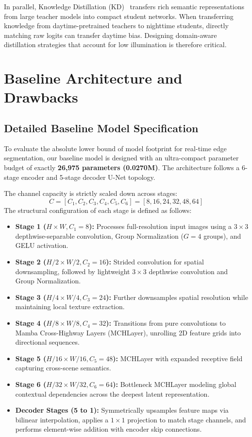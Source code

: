 \documentclass[conference]{IEEEtran}
\begin{document}
In parallel, Knowledge Distillation (KD)~\cite{hinton2015distilling} transfers rich semantic representations from large teacher models into compact student networks. When transferring knowledge from daytime-pretrained teachers to nighttime students, directly matching raw logits can transfer daytime bias. Designing domain-aware distillation strategies that account for low illumination is therefore critical.

\section{Baseline Architecture and Drawbacks}

\subsection{Detailed Baseline Model Specification}
To evaluate the absolute lower bound of model footprint for real-time edge segmentation, our baseline model is designed with an ultra-compact parameter budget of exactly \textbf{26,975 parameters (0.0270M)}. The architecture follows a 6-stage encoder and 5-stage decoder U-Net topology.

The channel capacity is strictly scaled down across stages:
\begin{equation}
C = [C_1, C_2, C_3, C_4, C_5, C_6] = [8, 16, 24, 32, 48, 64]
\end{equation}
The structural configuration of each stage is defined as follows:
\begin{itemize}
    \item \textbf{Stage 1 ($H \times W, C_1=8$):} Processes full-resolution input images using a $3 \times 3$ depthwise-separable convolution, Group Normalization ($G=4$ groups), and GELU activation.
    \item \textbf{Stage 2 ($H/2 \times W/2, C_2=16$):} Strided convolution for spatial downsampling, followed by lightweight $3 \times 3$ depthwise convolution and Group Normalization.
    \item \textbf{Stage 3 ($H/4 \times W/4, C_3=24$):} Further downsamples spatial resolution while maintaining local texture extraction.
    \item \textbf{Stage 4 ($H/8 \times W/8, C_4=32$):} Transitions from pure convolutions to Mamba Cross-Highway Layers (MCHLayer), unrolling 2D feature grids into directional sequences.
    \item \textbf{Stage 5 ($H/16 \times W/16, C_5=48$):} MCHLayer with expanded receptive field capturing cross-scene semantics.
    \item \textbf{Stage 6 ($H/32 \times W/32, C_6=64$):} Bottleneck MCHLayer modeling global contextual dependencies across the deepest latent representation.
    \item \textbf{Decoder Stages (5 to 1):} Symmetrically upsamples feature maps via bilinear interpolation, applies a $1 \times 1$ projection to match stage channels, and performs element-wise addition with encoder skip connections.
\end{itemize}
\end{document}
